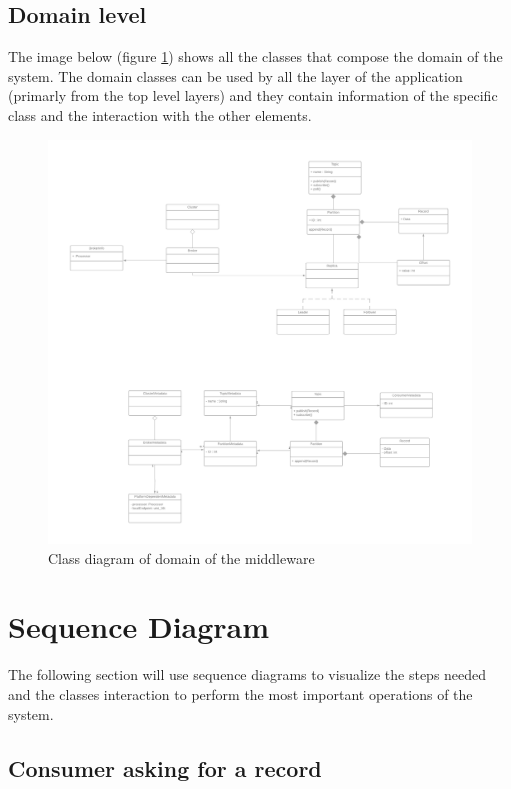\subsection{Domain level}

The image below (figure \ref{fig:class_diagram_domain}) shows all the classes
that compose the domain of the system.
The domain classes can be used by all the layer of the application (primarly
from the top level layers) and they contain information of the specific class
and the interaction with the other elements.

\begin{figure}[H]
    \centering
    \includegraphics[width=1.0\textwidth]{Figures/class_diagram_domain.png}
    \caption{Class diagram of domain of the middleware}
    \label{fig:class_diagram_domain}
\end{figure}

\section{Sequence Diagram}

The following section will use sequence diagrams to visualize the steps needed 
and the classes interaction to perform the most important operations of the
system.

\subsection{Consumer asking for a record}


